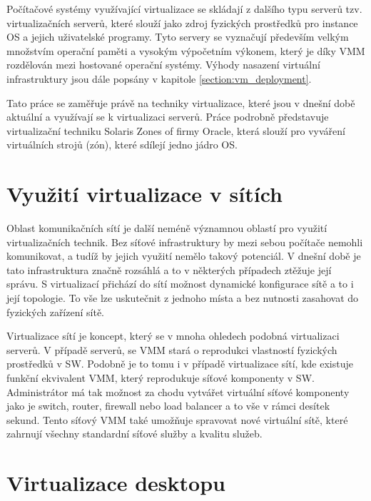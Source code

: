   Počítačové systémy využívající virtualizace se skládají z dalšího typu serverů tzv. virtualizačních serverů, které slouží jako zdroj fyzických prostředků pro instance OS a jejich uživatelské programy. Tyto servery
  se vyznačují především velkým množstvím operační paměti a vysokým výpočetním výkonem, který je díky VMM rozdělován mezi hostované operační systémy. Výhody nasazení virtuální infrastruktury jsou dále popsány v
  kapitole \ref{section:vm_deployment}.

  Tato práce se zaměřuje právě na techniky virtualizace, které jsou v dnešní době aktuální a využívají se k virtualizaci serverů. Práce podrobně představuje virtualizační techniku Solaris Zones of firmy Oracle,
  která slouží pro vyváření virtuálních strojů (zón), které sdílejí jedno jádro OS.

  \section{Využití virtualizace v sítích}
  \label{subsection:network_virtualization}

  Oblast komunikačních sítí je další neméně významnou oblastí pro využití virtualizačních technik. Bez síťové infrastruktury by mezi sebou počítače nemohli komunikovat, a tudíž by jejich využití nemělo takový potenciál.
  V dnešní době je tato infrastruktura značně rozsáhlá a to v některých případech ztěžuje její správu. S virtualizací přichází do sítí možnost dynamické konfigurace sítě a to i její topologie. To vše lze uskutečnit z 
  jednoho místa a bez nutnosti zasahovat do fyzických zařízení sítě.

  Virtualizace sítí je koncept, který se v mnoha ohledech podobná virtualizaci serverů. V případě serverů, se VMM stará o reprodukci vlastností fyzických prostředků v SW. Podobně je to tomu i v případě virtualizace sítí,
  kde existuje funkční ekvivalent VMM, který reprodukuje síťové komponenty v SW. Administrátor má tak možnost za chodu vytvářet virtuální síťové komponenty jako je switch, router, firewall nebo load balancer a to vše v
  rámci desítek sekund. Tento síťový VMM také umožňuje spravovat nové virtuální sítě, které zahrnují všechny standardní síťové služby a kvalitu služeb.\cite{article:vmware:network_virtualization}

  \section{Virtualizace desktopu}
  \label{subsection:desktop_virtualization}
  
